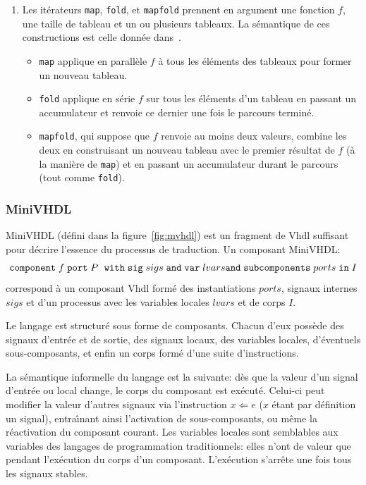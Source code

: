 \documentclass[a4paper]{article}
\newcommand{\minivhdl}{{\sc MiniVHDL}}
\newcommand{\vhdl}{{\sc Vhdl}}
\newcommand{\mybox}[1]{\mbox{\tt{#1}}}
\newcommand{\Component}[6]{\mybox{component} \; #1 \; \mybox{port} \; #2 \; \
  \mybox{with} \; \mybox{sig} \; #3 \; \mybox{and} \; \mybox{var} \; #4 \; \\
  \mybox{and} \; \mybox{subcomponents} \; #5 \; \mybox{in} \; #6}
\begin{document}
\begin{enumerate}
\item
Les it\'erateurs \texttt{map}, \texttt{fold}, et \texttt{mapfold}
prennent en argument une fonction $f$, une taille de tableau et un ou
plusieurs tableaux. La s\'emantique de ces constructions est celle
donn\'ee dans~\cite{lucy:genie00,morel-07-jes}.

\begin{itemize}
\item \texttt{map} applique en parall\`ele $f$ \`a tous les \'el\'ements des tableaux
  pour former un nouveau tableau.
\item \texttt{fold} applique en s\'erie $f$ sur tous les \'el\'ements d'un tableau en
  passant un accumulateur et renvoie ce dernier une fois le parcours termin\'e.
\item \texttt{mapfold}, qui suppose que $f$ renvoie au moins deux valeurs,
  combine les deux en construisant un nouveau tableau avec le premier r\'esultat
  de $f$ (\`a la mani\`ere de \texttt{map}) et en passant un accumulateur durant le
  parcours (tout comme \texttt{fold}).
\end{itemize}
\end{enumerate}

\subsubsection{MiniVHDL}

\minivhdl{} (d\'efini dans la figure~\ref{fig:mvhdl})
est un fragment de \vhdl{} suffisant pour
d\'ecrire l'essence du processus de traduction. Un composant \minivhdl:
\[
\Component{f}{P}{sigs}{lvars}{ports}{I}
\]
correspond \`a un
composant \vhdl{} form\'e des instantiations $ports$, signaux internes $sigs$ et d'un
processus avec les variables locales $lvars$ et de corps $I$.

Le langage est structur\'e sous forme de composants. Chacun d'eux poss\`ede des
signaux d'entr\'ee et de sortie, des signaux locaux, des variables locales, d'\'eventuels
sous-composants, et enfin un corps form\'e d'une suite d'instructions.

La s\'emantique informelle du langage est la suivante: d\`es que la valeur d'un
signal d'entr\'ee ou local change, le corps du composant est ex\'ecut\'e. Celui-ci
peut modifier la valeur d'autres signaux via l'instruction $x \Leftarrow e$ ($x$
\'etant par d\'efinition un signal), entra\^{\i}nant ainsi l'activation de
sous-composants, ou m\^eme la r\'eactivation du composant courant. Les variables
locales sont semblables aux variables des langages de programmation
traditionnels: elles n'ont de valeur que pendant l'ex\'ecution du corps d'un
composant. L'ex\'ecution s'arr\^ete une fois tous les signaux stables.
\end{document}

